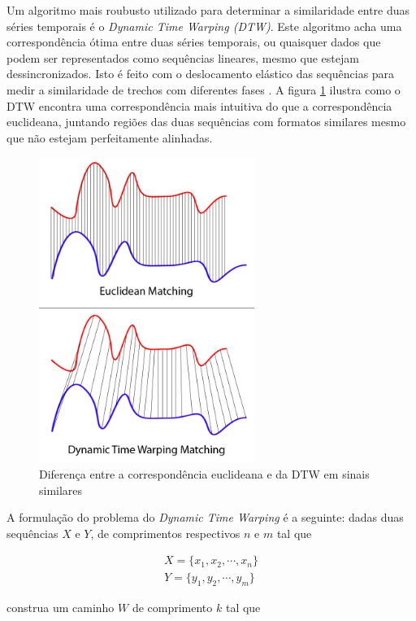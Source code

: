 Um algoritmo mais roubusto utilizado para determinar a similaridade entre duas séries temporais é o \textit{Dynamic Time Warping (DTW)}. Este algoritmo acha uma correspondência ótima entre duas séries temporais, ou quaisquer dados que podem ser representados como sequências lineares, mesmo que estejam dessincronizados. Isto é feito com o deslocamento elástico das sequências para medir a similaridade de trechos com diferentes fases \citep{shou2005fast}. A figura \ref{fig:euclidean-vs-dtw-matching} ilustra como o DTW encontra uma correspondência mais intuitiva do que a correspondência euclideana, juntando regiões das duas sequências com formatos similares mesmo que não estejam perfeitamente alinhadas.

\begin{figure}[htb]
\centering
\includegraphics[width=7cm]{figuras/Euclidean_vs_DTW.jpg}
\caption{Diferença entre a correspondência euclideana e da DTW em sinais similares \citep{dtwmatching}}
\label{fig:euclidean-vs-dtw-matching}
\end{figure}

A formulação do problema \citep{salvador2007toward} do \textit{Dynamic Time Warping} é a seguinte: dadas duas sequências $X$ e $Y$, de comprimentos respectivos $n$ e $m$ tal que 

\begin{align*}
    X = \{x_1, x_2, \cdots, x_n\} \\
    Y = \{y_1, y_2, \cdots, y_m\}
\end{align*}

construa um caminho $W$ de comprimento $k$ tal que


